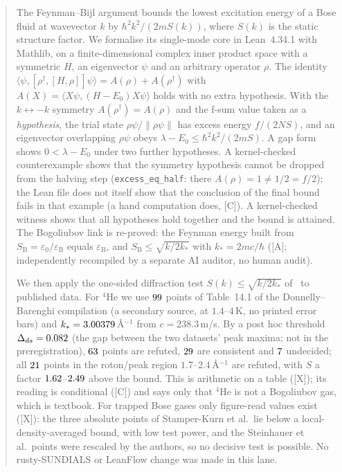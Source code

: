 \documentclass[11pt]{article}
\theoremstyle{remark}
\newcommand{\tier}[1]{\textsf{[#1]}}
\newcommand{\lean}[1]{\texttt{#1}}
\newcommand{\ks}{k_*}
\newcommand{\eps}{\varepsilon}
\newcommand{\hb}{\hbar}
\newcommand{\SB}{S_{\mathrm B}}
\newcommand{\eB}{\varepsilon_{\mathrm B}}
\newcommand{\ip}[2]{\langle #1,#2\rangle}
\begin{document}
\begin{abstract}
The Feynman--Bijl argument bounds the lowest excitation energy of a Bose fluid at wavevector $k$ by
$\hb^2k^2/(2mS(k))$, where $S(k)$ is the static structure factor. We formalise its single-mode core in Lean~4.34.1 with
Mathlib, on a finite-dimensional complex inner product space with a symmetric $H$, an eigenvector $\psi$ and an arbitrary
operator $\rho$. The identity $\ip{\psi}{[\rho^\dagger,[H,\rho]]\psi}=A(\rho)+A(\rho^\dagger)$ with
$A(X)=\ip{X\psi}{(H-E_0)X\psi}$ holds with no extra hypothesis. With the $k\leftrightarrow-k$ symmetry $A(\rho^\dagger)=A(\rho)$
and the f-sum value taken as a \emph{hypothesis}, the trial state $\rho\psi/\|\rho\psi\|$ has excess energy $f/(2NS)$, and an
eigenvector overlapping $\rho\psi$ obeys $\lambda-E_0\le\hb^2k^2/(2mS)$. A gap form shows $0<\lambda-E_0$ under two further
hypotheses. A kernel-checked counterexample shows that the symmetry hypothesis cannot be dropped from the halving step
(\lean{excess\_eq\_half}: there $A(\rho)=1\ne1/2=f/2$); the Lean file does not itself show that the conclusion of the final bound fails in that example (a hand computation does, \tier{C}).
A kernel-checked witness shows that all hypotheses hold together and the bound is attained. The Bogoliubov link is re-proved: the Feynman energy
built from $\SB=\eps_0/\eB$ equals $\eB$, and $\SB\le\sqrt{k/2\ks}$ with $\ks=2mc/\hb$ (\tier{A}; independently recompiled by a separate AI auditor, no human audit).

We then apply the one-sided diffraction test $S(k)\le\sqrt{k/2\ks}$ of~\cite{bsk} to published data. For $^4$He we use $\PHNPoints$
points of Table~14.1 of the Donnelly--Barenghi compilation (a secondary source, at $1.4$--$4$\,K, no printed error bars) and
$\ks=\PHKstar$\,\AA$^{-1}$ from $c=238.3$\,m/s. By a post hoc threshold $\Delta_{ds}=\PHDeltaDS$ (the gap between the two datasets' peak
maxima; not in the preregistration), $\PHNRef$ points are refuted, $\PHNCons$ are consistent and $\PHNUnd$ undecided; all
$\PHRotonN$ points in the roton/peak region $1.7$--$2.4$\,\AA$^{-1}$ are refuted, with $S$ a factor $\PHRotonRatioLo$--$\PHRotonRatioHi$ above the bound.
This is arithmetic on a table (\tier{X}); its reading is conditional (\tier{C}) and says only that $^4$He is not a Bogoliubov gas, which is
textbook. For trapped Bose gases only figure-read values exist (\tier{X}): the three absolute points of Stamper-Kurn et al.\ lie below
a local-density-averaged bound, with low test power, and the Steinhauer et al.\ points were rescaled by the authors, so no
decisive test is possible. No rusty-SUNDIALS or LeanFlow change was made in this lane.
\end{abstract}
\end{document}
